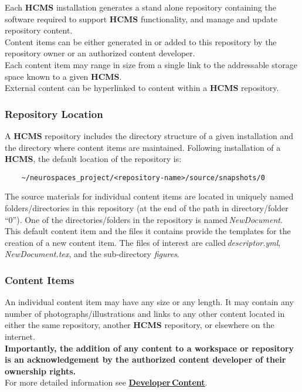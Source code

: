 \documentclass[12pt]{article}
\begin{document}
Each {\bf \small HCMS} installation generates a stand alone repository containing the software required to support {\bf \small HCMS} functionality, and manage and update repository content.\\
Content items can be either generated in or added to this repository by the repository owner or an authorized content developer.\\
Each content item may range in size from a single link to the addressable storage space known to a given {\bf \small HCMS}.\\
External content can be hyperlinked to content within a {\bf \small HCMS} repository.

\subsubsection*{Repository Location}

A {\bf \small HCMS} repository includes the directory structure of a given installation and the directory where content items are maintained. Following installation of a {\bf \small HCMS}, the default location of the repository is:

\begin{verbatim}
    ~/neurospaces_project/<repository-name>/source/snapshots/0
\end{verbatim}
The source materials for individual content items are located in uniquely named folders/directories in this repository (at the end of the path in directory/folder ``0''). One of the directories/folders in the repository is named\,{\it NewDocument}. This default content item and the files it contains provide the templates for the creation of a new content item. The files of interest are called\,{\it descriptor.yml}, {\it NewDocument.tex}, and the sub-directory {\it figures}.

\subsubsection*{Content Items}

An individual content item may have any size or any length. It may contain any number of photographs/illustrations and links to any other content located in either the same repository, another {\bf \small HCMS} repository, or elsewhere on the internet.\\
{\bf Importantly, the addition of any content to a workspace or repository is an acknowledgement by the authorized content developer of their ownership rights.}\\
For more detailed information see \href{../developer-content/developer-content.tex}{\bf Developer\,Content}.



\end{document}
